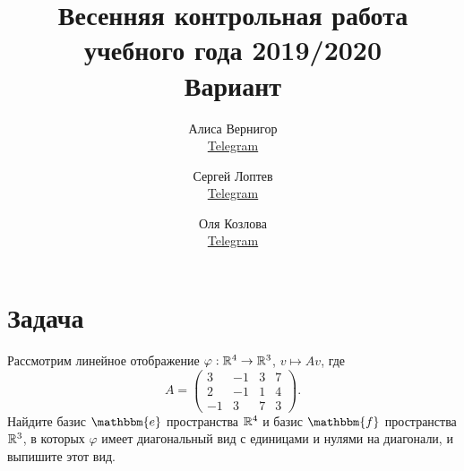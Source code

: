 \documentclass[a4paper]{article}
\title{Весенняя контрольная работа учебного года 2019/2020\\Вариант \textnumero 1}
\author{	
  Алиса Вернигор       \\ \href{https://t.me/allisyonok}{Telegram} \and
	Сергей Лоптев        \\ \href{https://t.me/beast_sl}{Telegram} \and
	Оля Козлова        \\ \href{https://t.me/grenlayk}{Telegram}
}
\date{}
\theoremstyle{remark}
\begin{document}
	\maketitle
    \section*{Задача }
        Рассмотрим линейное отображение $\varphi: \mathbb{R}^4 \to \mathbb{R}^3$, $v \mapsto Av$, где
        \begin{equation*}
          A = \begin{pmatrix}
            3 & -1 & 3 & 7 \\
            2 & -1 & 1 & 4 \\
            -1 & 3 & 7 & 3
          \end{pmatrix}.
        \end{equation*}
        Найдите базис $\mathbbm{e}$ пространства $\mathbb{R}^4$ и базис $\mathbbm{f}$ пространства $\mathbb{R}^3$, в которых $\varphi$ имеет диагональный вид с единицами и нулями на диагонали, и выпишите этот вид.
\end{document}
